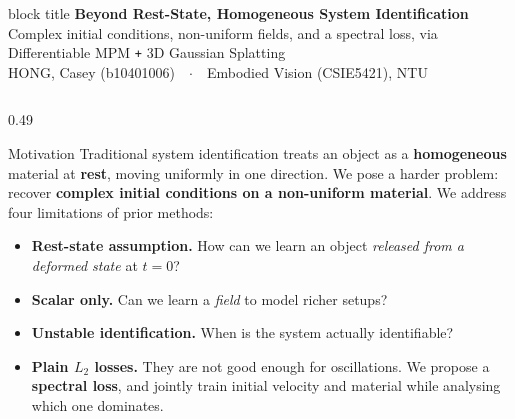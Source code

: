 \documentclass[final,t]{beamer}
\begin{document}
\begin{frame}[t]{}

\begin{beamercolorbox}[wd=\textwidth,rounded=true,sep=0.9cm,leftskip=1.5cm,rightskip=1.5cm]{block title}
  \centering
  {\Huge\bfseries Beyond Rest-State, Homogeneous System Identification}\\[4mm]
  {\large Complex initial conditions, non-uniform fields, and a spectral loss, via Differentiable MPM \texttt{+} 3D Gaussian Splatting}\\[4mm]
  {\large HONG, Casey (b10401006)\ \ $\cdot$\ \ Embodied Vision (CSIE5421), NTU}
\end{beamercolorbox}
\vspace{0.1cm}

\begin{columns}[t,totalwidth=\textwidth]
\begin{column}{0.49\textwidth}
\begin{block}{Motivation}
Traditional system identification treats an object as a \textbf{homogeneous}
material at \textbf{rest}, moving uniformly in one direction. We pose a harder
problem: recover \textbf{complex initial conditions on a non-uniform material}.
We address four limitations of prior methods:
\begin{itemize}
  \item \textbf{Rest-state assumption.} How can we learn an object
        \emph{released from a deformed state} at $t{=}0$?
  \item \textbf{Scalar only.} Can we learn a \emph{field} to model richer setups?
  \item \textbf{Unstable identification.} When is the system actually
        identifiable?
  \item \textbf{Plain $L_2$ losses.} They are not good enough for oscillations.
        We propose a \textbf{spectral loss}, and jointly train initial velocity
        and material while analysing which one dominates.
\end{itemize}
\end{block}
\end{column}


\end{columns}
\end{frame}
\end{document}
